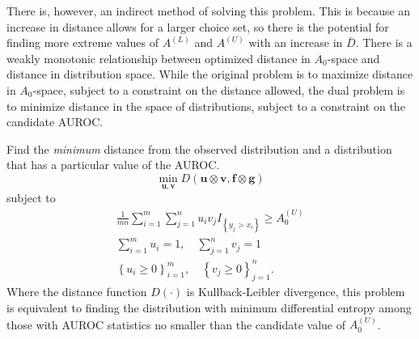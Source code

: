 There is, however, an indirect method of solving this problem.
This is because an increase in distance allows for a larger choice set, so there is the potential for finding more extreme values of $A^{(L)}$ and  $A^{(U)}$ with an increase in $\bar{D}$.
%
%
There is a weakly monotonic relationship between optimized distance in $A_0$-space and distance in distribution space.
While the original problem is to maximize distance in $A_0$-space, subject to a constraint on the distance allowed,
the dual problem is to minimize distance in the space of distributions, subject to a constraint on the candidate AUROC.




Find the \emph{minimum} distance from the observed distribution and a distribution that has a particular value of the AUROC.
%
\begin{equation}
    \min_{\mathbf{u}, \mathbf{v}}
        D(\mathbf{u} \otimes \mathbf{v}, \mathbf{f} \otimes \mathbf{g})
\end{equation}
%
\noindent subject to
%
\begin{align}
    \frac{1}{m n} \sum_{i = 1}^{m} \sum_{j = 1}^{n} u_i v_j I_{\left\{ y_j > x_i \right\}} \geq A^{(U)}_0 \\
    \sum_{i = 1}^{m} u_i = 1, \quad \sum_{j = 1}^{n} v_j = 1 \\
    \left\{ u_i  \geq 0 \right\}_{i=1}^{m}, \quad \left\{ v_j \geq 0 \right\}_{j=1}^{n}.
\end{align}
%
Where the distance function $D(\cdot)$ is Kullback-Leibler divergence, this problem is equivalent to finding the distribution with minimum differential entropy among those with AUROC statistics no smaller than the candidate value of $A^{(U)}_0$. 






